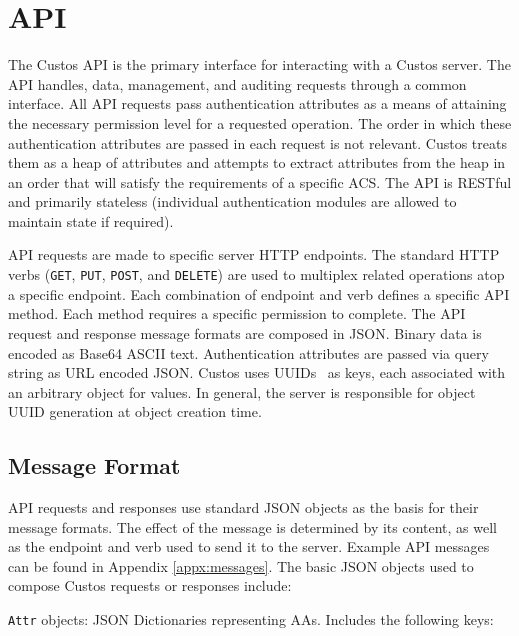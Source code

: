 \section{API}

The Custos API is the primary interface for interacting with a Custos
server. The API handles, data, management, and auditing requests
through a common interface. All API requests pass authentication
attributes as a means of attaining the necessary permission level for
a requested operation. The order in which these authentication
attributes are passed in each request is not relevant. Custos treats
them as a heap of attributes and attempts to extract attributes from
the heap in an order that will satisfy the requirements of a specific
ACS. The API is RESTful and primarily stateless (individual
authentication modules are allowed to maintain state if required).

API requests are made to specific server HTTP endpoints. The standard
HTTP verbs (\texttt{GET}, \texttt{PUT}, \texttt{POST}, and
\texttt{DELETE}) are used to multiplex related operations atop a
specific endpoint. Each combination of endpoint and verb defines a
specific API method. Each method requires a specific permission to
complete. The API request and response message formats are composed in
JSON. Binary data is encoded as Base64 ASCII text. Authentication
attributes are passed via query string as URL encoded JSON. Custos
uses UUIDs~\cite{Leach2005} as keys, each associated with an arbitrary
object for values. In general, the server is responsible for object
UUID generation at object creation time.

\subsection{Message Format}

API requests and responses use standard JSON objects as the basis for
their message formats. The effect of the message is determined by its
content, as well as the endpoint and verb used to send it to the
server. Example API messages can be found in Appendix
\ref{appx:messages}. The basic JSON objects used to compose Custos
requests or responses include:

\noindent
\texttt{Attr} objects: JSON Dictionaries representing AAs. Includes
the following keys:

